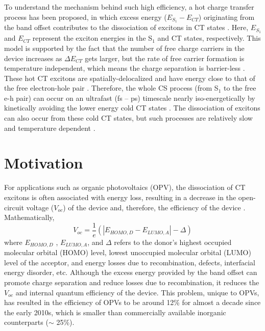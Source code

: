\documentclass[12pt]{article}
\begin{document}
To understand the mechanism behind such high efficiency, a hot charge transfer process has been proposed, in which excess energy ($E_{S_1} - E_{CT}$) originating from the band offset contributes to the dissociation of excitons in CT states \cite{clarke2010charge}. Here, $E_{S_1}$ and $E_{CT}$ represent the exciton energies in the S$_1$ and CT states, respectively. This model is supported by the fact that the number of free charge
carriers in the device increases as $\Delta E_{CT}$ gets larger, but the rate of free carrier formation is temperature independent, which means the charge separation is barrier-less \cite{ohkita2008charge,clarke2008free,pensack2009barrierless}. These 
 hot CT excitons are spatially-delocalized and have energy close to that of the free electron-hole pair \cite{grancini2013hot,jailaubekov2013hot,gelinas2014ultrafast,savoie2014unequal}. Therefore, the whole CS process (from S$_1$ to the free e-h pair) can occur on an ultrafast (fs – ps) 
 timescale nearly iso-energetically by kinetically avoiding the lower energy cold CT states \cite{grancini2013hot,jailaubekov2013hot,gelinas2014ultrafast,savoie2014unequal}. The dissociation of excitons can also occur from these cold CT states, but such processes are relatively slow and temperature dependent \cite{bernede2008organic,gautam2016charge,athanasopoulos2017efficient,fazzi2017hot}.


\section{Motivation}
For applications such as organic photovoltaics (OPV), the dissociation of CT excitons is often associated with energy loss, resulting in a decrease in the open-circuit voltage ($V_{oc}$) of the device and, therefore, the efficiency of the device \cite{yao2015quantifying,rand2007offset,liu2019engineering}. Mathematically, 
\begin{equation}
   V_{oc} = \frac{1}{e}( |E_{HOMO,D} - E_{LUMO,A}| - \Delta)
\end{equation}
 where $E_{HOMO,D}$ , $E_{LUMO,A}$, and $\Delta$ refers to the donor's highest occupied molecular orbital (HOMO) level, lowest unoccupied molecular orbital (LUMO) level of the acceptor, and energy losses due to recombination, defects, interfacial energy disorder, etc. Although the excess energy provided by the band offset can promote charge separation and reduce losses due to recombination, it reduces the $V_{oc}$ and internal quantum efficiency of the device. This problem, unique to OPVs, has resulted in the efficiency of OPVs to be around 12\% for almost a decade since the early 2010s, which is smaller than commercially available inorganic counterparts ($\sim$ 25\%).
\end{document}
